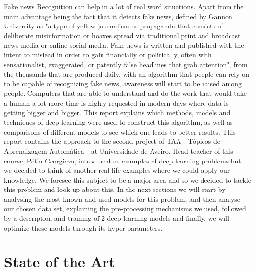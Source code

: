 \documentclass[conference]{IEEEtran}
\newcommand\tab[1][0.4cm]{\hspace*{#1}}
\begin{document}
Fake news Recognition can help in a lot of real word situations. Apart from the main advantage being the fact that it detects fake news, defined by Gannon University \cite{H} as "a type of yellow journalism or propaganda that consists of deliberate misinformation or hoaxes spread via traditional print and broadcast news media or online social media. Fake news is written and published with the intent to mislead in order to gain financially or politically, often with sensationalist, exaggerated, or patently false headlines that grab attention", from the thousands that are produced daily, with an algorithm that people can rely on to be capable of recognizing fake news, awareness will start to be raised among people. Computers that are able to understand and do the work that would take a human a lot more time is highly requested in modern days where data is getting bigger and bigger. This report explains which methods, models and techniques of deep learning were used to construct this algorithm, as well as comparisons of different models to see which one leads to better results.
\linebreak
\tab This report contains the approach to the second project of TAA - Tópicos de Aprendizagem Automática - at Universidade de Aveiro. Head teacher of this course, Pétia Georgieva, introduced us examples of deep learning problems but we decided to think of another real life examples where we could apply our knowledge. We foresee this subject to be a major area and so we decided to tackle this problem and look up about this.
\linebreak
\tab In the next sections we will start by analysing the most known and used models for this problem, and then analyse our chosen data set, explaining the pre-processing mechanisms we used, followed by a description and training of 2 deep learning models and finally, we will optimize these models through its hyper parameters.

\section{State of the Art \cite{I} \cite{F} \cite{N} \cite{V}}
\end{document}
